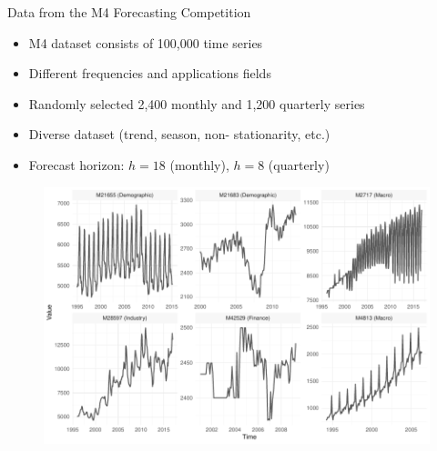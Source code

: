 \documentclass[aspectratio=169]{beamer}
\begin{document}
\begin{frame}[t]{Data from the M4 Forecasting Competition}
    \begin{minipage}[t]{0.3\textwidth}
        \vspace{0pt}
        \begin{itemize}
        		\item M4 dataset consists of 100,000 time series
			\item Different frequencies and applications fields
			\item Randomly selected 2,400 monthly and 1,200 quarterly series
			\item Diverse dataset (trend, season, non- stationarity, etc.)
        	    \item Forecast horizon: $h = 18$ (monthly), $h = 8$ (quarterly)
        \end{itemize}
    \end{minipage}%
    \hfill
    \begin{minipage}[t]{0.7\textwidth}
        \vspace{0pt}
 		\begin{figure}[H]
		\center
			\includegraphics[scale=0.7]{figures/figure_03_data_sample_wide.pdf}
		\end{figure}
    \end{minipage}
\end{frame}
\end{document}
